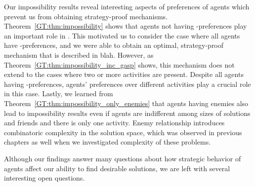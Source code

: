 Our impossibility results reveal interesting aspects of preferences of agents which prevent us from obtaining strategy-proof mechanisms.  Theorem~\ref{GT:thm:impossibility} shows that agents not having \INC-preferences play an important role in \AOIP. This motivated us to consider the case where all agents have \INC-preferences, and we were able to obtain an optimal, strategy-proof mechanism that is described in blah.
However, as Theorem~\ref{GT:thm:impossibility_inc_gasp} shows, this mechanism does not extend to the cases where two or more activities are present. Despite all agents having \INC-preferences, agents' preferences over different activities play a crucial role in this case. Lastly, we learned from Theorem~\ref{GT:thm:impossibility_only_enemies} that agents having enemies also lead to impossibility results even if agents are indifferent among sizes of solutions and friends and there is only one activity. Enemy relationship introduces combinatoric complexity in the solution space, which was observed in previous chapters as well when we investigated complexity of these problems.

Although our findings answer many questions about how strategic behavior of agents affect our ability to find desirable solutions, we are left with several interesting open questions. %


